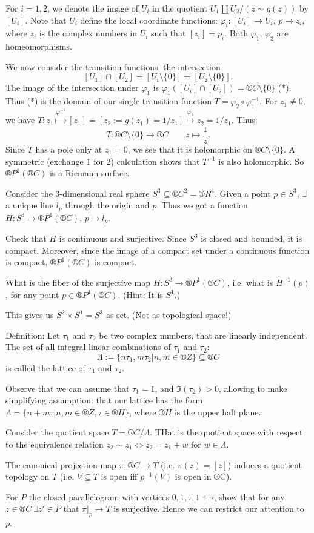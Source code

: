 \documentclass[12pt]{article}					%
\begin{document}
\begin{poznamka}
	For $i = 1, 2$, we denote the image of $U_i$ in the quotient $U_1 \coprod U_2 / (z \sim g(z))$ by $[U_i]$. Note that $U_i$ define the local coordinate functions: $φ_i: [U_i] \rightarrow U_i$, $p \mapsto z_i$, where $z_i$ is the complex numbers in $U_i$ such that $[z_i] = p_i$. Both $φ_1$, $φ_2$ are homeomorphisms.

	We now consider the transition functions: the intersection
	$$ [U_1] \cap [U_2] = [U_i \setminus \{0\}] = [U_2 \setminus \{0\}]. $$
	The image of the intersection under $φ_1$ is $φ_1([U_i] \cap [U_2]) = ®C \setminus \{0\}$ (*). Thus (*) is the domain of our single transition function $T = φ_2 ∘ φ_1^{-1}$. For $z_1 ≠ 0$, we have $T: z_1 \overset{φ_1^{-1}}\mapsto [z_1] = [z_2 := g(z_1) = 1 / z_1] \overset{φ_1}\mapsto z_2 = 1 / z_1$. Thus
	$$ T: ®C \setminus \{0\} \rightarrow ®C \qquad z \mapsto \frac{1}{z}. $$
	Since $T$ has a pole only at $z_1 = 0$, we see that it is holomorphic on $®C \setminus \{0\}$. A symmetric (exchange 1 for 2) calculation shows that $T^{-1}$ is also holomorphic. So $®P^1(®C)$ is a Riemann surface.
\end{poznamka}

\begin{priklad}
	Consider the 3-dimensional real sphere $S^3 \subseteq ®C^2 = ®R^4$. Given a point $p \in S^3$, $\exists$ a unique line $l_p$ through the origin and $p$. Thus we got a function $H: S^3 \rightarrow ®P^1(®C)$, $p \mapsto l_p$.

	Check that $H$ is continuous and surjective. Since $S^3$ is closed and bounded, it is compact. Moreover, since the image of a compact set under a continuous function is compact, $®P^1(®C)$ is compact.

	What is the fiber of the surjective map $H: S^3 \rightarrow ®P^1(®C)$, i.e. what is $H^{-1}(p)$, for any point $p \in ®P^1(®C)$. (Hint: It is $S^1$.)

	This gives us $S^2 \times S^1 = S^3$ as set. (Not as topological space!)
\end{priklad}

\begin{priklad}
	Definition: Let $τ_1$ and $τ_2$ be two complex numbers, that are linearly independent. The set of all integral linear combinations of $τ_1$ and $τ_2$:
	$$ Λ := \{nτ_1, mτ_2 | n,m \in ®Z\} \subseteq ®C $$
	is called the lattice of $τ_1$ and $τ_2$.

	Observe that we can assume that $τ_1 = 1$, and $\Im(τ_2) > 0$, allowing to make simplifying assumption: that our lattice has the form $Λ = \{n + mτ | n, m \in ®Z, τ \in ®H\}$, where $®H$ is the upper half plane.

	Consider the quotient space $T = ®C / Λ$. THat is the quotient space with respect to the equivalence relation $z_2 \sim z_1 \Leftrightarrow z_2 = z_1 + w$ for $w \in Λ$.

	The canonical projection map $π: ®C \rightarrow T$ (i.e. $π(z) = [z]$) induces a quotient topology on $T$ (i.e. $V \subseteq T$ is open iff $p^{-1}(V)$ is open in ®C).
\end{priklad}

\begin{priklad}
	For $P$ the closed parallelogram with vertices $0, 1, τ, 1+τ$, show that for any $z \in ®C\ \exists z' \in P$ that $π|_p \rightarrow T$ is surjective. Hence we can restrict our attention to $p$.
\end{priklad}
\end{document}
